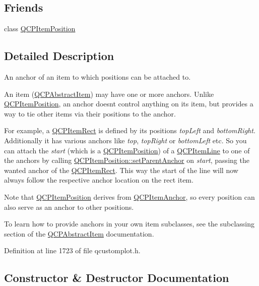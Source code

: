 \subsection*{Friends}
\begin{DoxyCompactItemize}
\item 
class \hyperlink{class_q_c_p_item_anchor_aa9b8ddc062778e202a0be06a57d18d17}{Q\+C\+P\+Item\+Position}
\end{DoxyCompactItemize}


\subsection{Detailed Description}
An anchor of an item to which positions can be attached to. 

An item (\hyperlink{class_q_c_p_abstract_item}{Q\+C\+P\+Abstract\+Item}) may have one or more anchors. Unlike \hyperlink{class_q_c_p_item_position}{Q\+C\+P\+Item\+Position}, an anchor doesn\textquotesingle{}t control anything on its item, but provides a way to tie other items via their positions to the anchor.

For example, a \hyperlink{class_q_c_p_item_rect}{Q\+C\+P\+Item\+Rect} is defined by its positions {\itshape top\+Left} and {\itshape bottom\+Right}. Additionally it has various anchors like {\itshape top}, {\itshape top\+Right} or {\itshape bottom\+Left} etc. So you can attach the {\itshape start} (which is a \hyperlink{class_q_c_p_item_position}{Q\+C\+P\+Item\+Position}) of a \hyperlink{class_q_c_p_item_line}{Q\+C\+P\+Item\+Line} to one of the anchors by calling \hyperlink{class_q_c_p_item_position_ac094d67a95d2dceafa0d50b9db3a7e51}{Q\+C\+P\+Item\+Position\+::set\+Parent\+Anchor} on {\itshape start}, passing the wanted anchor of the \hyperlink{class_q_c_p_item_rect}{Q\+C\+P\+Item\+Rect}. This way the start of the line will now always follow the respective anchor location on the rect item.

Note that \hyperlink{class_q_c_p_item_position}{Q\+C\+P\+Item\+Position} derives from \hyperlink{class_q_c_p_item_anchor}{Q\+C\+P\+Item\+Anchor}, so every position can also serve as an anchor to other positions.

To learn how to provide anchors in your own item subclasses, see the subclassing section of the \hyperlink{class_q_c_p_abstract_item}{Q\+C\+P\+Abstract\+Item} documentation. 

Definition at line 1723 of file qcustomplot.\+h.



\subsection{Constructor \& Destructor Documentation}
\hypertarget{class_q_c_p_item_anchor_aeb6b681d2bf324db40a915d32ec5624f}{}
